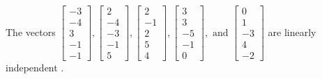 \begin{exercise}
\begin{exerciseStatement}
  \end{exerciseStatement}
  \begin{exerciseAnswer}
   The vectors \(\left[\begin{array}{r}
-3 \\
-4 \\
3 \\
-1 \\
-1
\end{array}\right] , \left[\begin{array}{r}
2 \\
-4 \\
-3 \\
-1 \\
5
\end{array}\right] , \left[\begin{array}{r}
2 \\
-1 \\
2 \\
5 \\
4
\end{array}\right] , \left[\begin{array}{r}
3 \\
3 \\
-5 \\
-1 \\
0
\end{array}\right] , \text{ and } \left[\begin{array}{r}
0 \\
1 \\
-3 \\
4 \\
-2
\end{array}\right]\) are 
  	 linearly independent  .
  


  \end{exerciseAnswer}
\end{exercise}